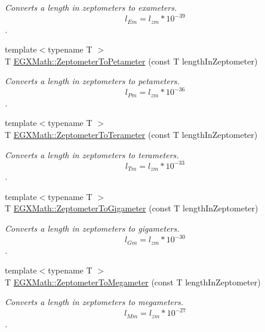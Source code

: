\begin{DoxyCompactItemize}
\begin{DoxyCompactList}\small\item\em Converts a length in zeptometers to exameters. \[ l_{Em}=l_{zm} * 10^{-39} \]. \end{DoxyCompactList}\item 
{\footnotesize template$<$typename T $>$ }\\T \mbox{\hyperlink{group___e_g_x_math-_conversions-_length_conversions-_zeptometer-_s_i_ga8d63077fa2d65649004804647da5af60}{E\+G\+X\+Math\+::\+Zeptometer\+To\+Petameter}} (const T length\+In\+Zeptometer)
\begin{DoxyCompactList}\small\item\em Converts a length in zeptometers to petameters. \[ l_{Pm}=l_{zm} * 10^{-36} \]. \end{DoxyCompactList}\item 
{\footnotesize template$<$typename T $>$ }\\T \mbox{\hyperlink{group___e_g_x_math-_conversions-_length_conversions-_zeptometer-_s_i_ga442c02caa8b630c3f90675191b22bca5}{E\+G\+X\+Math\+::\+Zeptometer\+To\+Terameter}} (const T length\+In\+Zeptometer)
\begin{DoxyCompactList}\small\item\em Converts a length in zeptometers to terameters. \[ l_{Tm}=l_{zm} * 10^{-33} \]. \end{DoxyCompactList}\item 
{\footnotesize template$<$typename T $>$ }\\T \mbox{\hyperlink{group___e_g_x_math-_conversions-_length_conversions-_zeptometer-_s_i_ga730e0331ec8efc46b557692f5f515d03}{E\+G\+X\+Math\+::\+Zeptometer\+To\+Gigameter}} (const T length\+In\+Zeptometer)
\begin{DoxyCompactList}\small\item\em Converts a length in zeptometers to gigameters. \[ l_{Gm}=l_{zm} * 10^{-30} \]. \end{DoxyCompactList}\item 
{\footnotesize template$<$typename T $>$ }\\T \mbox{\hyperlink{group___e_g_x_math-_conversions-_length_conversions-_zeptometer-_s_i_ga53c621beeed03e51c3ad8a5cc267a35f}{E\+G\+X\+Math\+::\+Zeptometer\+To\+Megameter}} (const T length\+In\+Zeptometer)
\begin{DoxyCompactList}\small\item\em Converts a length in zeptometers to megameters. \[ l_{Mm}=l_{zm} * 10^{-27} \]. \end{DoxyCompactList}\item 

\end{DoxyCompactItemize}
